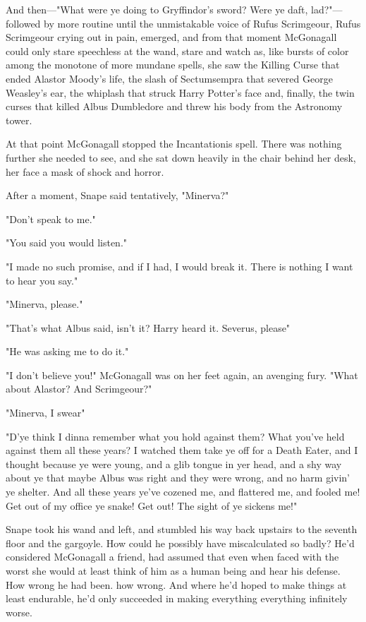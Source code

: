 And then—"What were ye doing to Gryffindor's sword? Were ye daft, lad?"—followed by more routine until the unmistakable voice of Rufus Scrimgeour, Rufus Scrimgeour crying out in pain, emerged, and from that moment McGonagall could only stare speechless at the wand, stare and watch as, like bursts of color among the monotone of more mundane spells, she saw the Killing Curse that ended Alastor Moody's life, the slash of Sectumsempra that severed George Weasley's ear, the whiplash that struck Harry Potter's face and, finally, the twin curses that killed Albus Dumbledore and threw his body from the Astronomy tower.

At that point McGonagall stopped the Incantationis spell. There was nothing further she needed to see, and she sat down heavily in the chair behind her desk, her face a mask of shock and horror.

After a moment, Snape said tentatively, "Minerva?"

"Don't speak to me."

"You said you would listen."

"I made no such promise, and if I had, I would break it. There is nothing I want to hear you say."

"Minerva, please."

"That's what Albus said, isn't it? Harry heard it. Severus, please{\el}"

"He was asking me to do it."

"I don't believe you!" McGonagall was on her feet again, an avenging fury. "What about Alastor? And Scrimgeour?"

"Minerva, I swear{\el}"

"D'ye think I dinna remember what you hold against them? What you've held against them all these years? I watched them take ye off for a Death Eater, and I thought because ye were young, and a glib tongue in yer head, and a shy way about ye that maybe Albus was right and they were wrong, and no harm givin' ye shelter. And all these years ye've cozened me, and flattered me, and fooled me! Get out of my office ye snake! Get out! The sight of ye sickens me!"

Snape took his wand and left, and stumbled his way back upstairs to the seventh floor and the gargoyle. How could he possibly have miscalculated so badly? He'd considered McGonagall a friend, had assumed that even when faced with the worst she would at least think of him as a human being and hear his defense. How wrong he had been.{\el} how wrong. And where he'd hoped to make things at least endurable, he'd only succeeded in making everything{\el} everything{\el} infinitely worse.

